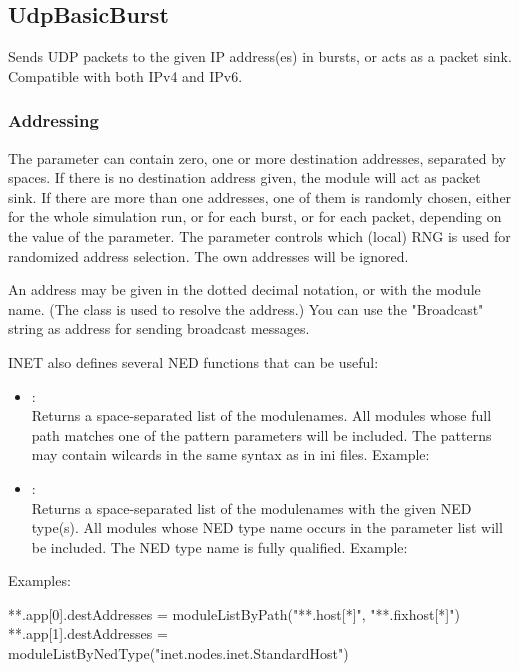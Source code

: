 \subsection{UdpBasicBurst}
\label{sec:apps:udpbasicburst}

Sends UDP packets to the given IP address(es) in bursts, or acts as a
packet sink. Compatible with both IPv4 and IPv6.

\subsubsection*{Addressing}

The  parameter can contain zero, one or more destination
addresses, separated by spaces. If there is no destination address given,
the module will act as packet sink. If there are more than one addresses,
one of them is randomly chosen, either for the whole simulation run,
or for each burst, or for each packet, depending on the value of the
 parameter. The  parameter controls which
(local) RNG is used for randomized address selection.
The own addresses will be ignored.

An address may be given in the dotted decimal notation, or with the module
name. (The  class is used to resolve the address.)
You can use the "Broadcast" string as address for sending broadcast messages.

INET also defines several NED functions that can be useful:

\begin{itemize}
\item {}: \\
         Returns a space-separated list of the modulenames.
         All modules whose full path matches one of the pattern parameters will be included.
         The patterns may contain wilcards in the same syntax as in ini files.
         Example:
\item {}: \\
         Returns a space-separated list of the modulenames with the given NED type(s).
         All modules whose NED type name occurs in the parameter list will be included.
         The NED type name is fully qualified. Example:
\end{itemize}

Examples:

\begin{inifile}
**.app[0].destAddresses = moduleListByPath("**.host[*]", "**.fixhost[*]")
**.app[1].destAddresses = moduleListByNedType("inet.nodes.inet.StandardHost")
\end{inifile}

